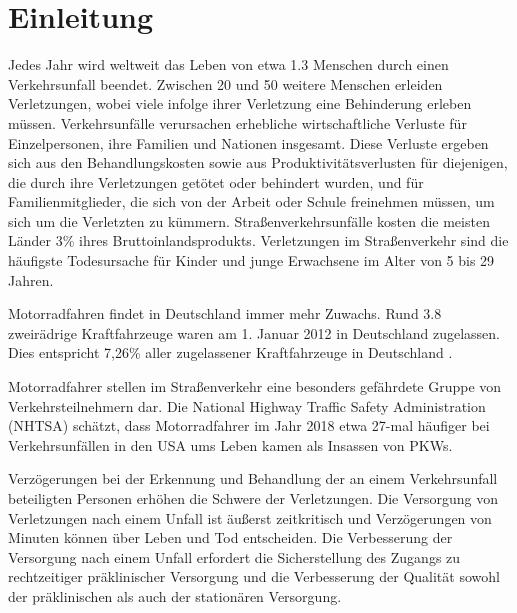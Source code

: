 \chapter{Einleitung}
%
%
%
%
%
%
Jedes Jahr wird weltweit das Leben von etwa \SI{1,3}{\Million} Menschen durch einen Verkehrsunfall beendet. Zwischen \SI{20}{\Million} und \SI{50}{\Million} weitere Menschen erleiden Verletzungen, wobei viele infolge ihrer Verletzung eine Behinderung erleben müssen. Verkehrsunfälle verursachen erhebliche wirtschaftliche Verluste für Einzelpersonen, ihre Familien und Nationen insgesamt. Diese Verluste ergeben sich aus den Behandlungskosten sowie aus Produktivitätsverlusten für diejenigen, die durch ihre Verletzungen getötet oder behindert wurden, und für Familienmitglieder, die sich von der Arbeit oder Schule freinehmen müssen, um sich um die Verletzten zu kümmern. Straßenverkehrsunfälle kosten die meisten Länder 3\% ihres Bruttoinlandsprodukts. Verletzungen im Straßenverkehr sind die häufigste Todesursache für Kinder und junge Erwachsene im Alter von 5 bis 29 Jahren.\citep{healthorganization2022}

Motorradfahren findet in Deutschland immer mehr Zuwachs.  Rund \SI{3,8}{\Million} zwei\-rädrige Kraftfahrzeuge waren am 1. Januar 2012 in Deutschland zugelassen. Dies entspricht 7,26\% aller zugelassener Kraftfahrzeuge in Deutschland \citep{Haedrich2012}.

Motorradfahrer stellen im Straßenverkehr eine besonders gefährdete Gruppe von Verkehrsteilnehmern dar. Die National Highway Traffic Safety Administration (NHTSA) schätzt, dass Motorradfahrer im Jahr 2018 etwa 27-mal häufiger bei Verkehrsunfällen in den USA ums Leben kamen als Insassen von PKWs\citep{NHTSA}.

Verzögerungen bei der Erkennung und Behandlung der an einem Verkehrsunfall beteiligten Personen erhöhen die Schwere der Verletzungen. Die Versorgung von Verletzungen nach einem Unfall ist äußerst zeitkritisch und Verzögerungen von Minuten können über Leben und Tod entscheiden. Die Verbesserung der Versorgung nach einem Unfall erfordert die Sicherstellung des Zugangs zu rechtzeitiger präklinischer Versorgung und die Verbesserung der Qualität sowohl der präklinischen als auch der stationären Versorgung.\citep{healthorganization2022}

